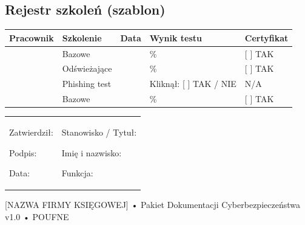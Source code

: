 \documentclass[12pt,a4paper]{article}
\begin{document}
\subsection{Rejestr szkoleń (szablon) }\label{rejestr-szkoleux144}

\begin{longtable}[]{@{}>{\raggedright\arraybackslash}p{}>{\raggedright\arraybackslash}p{}>{\raggedright\arraybackslash}p{}>{\raggedright\arraybackslash}p{}>{\raggedright\arraybackslash}p{}@{}}
\toprule\noalign{}
Pracownik & Szkolenie & Data & Wynik testu & Certyfikat \\
\midrule\noalign{}
\endhead
\bottomrule\noalign{}
\endlastfoot
\underline{\hspace{3cm}} & Bazowe & \underline{\hspace{2cm}} &
\underline{\hspace{2cm}}\% & {[} {]} TAK \\
\underline{\hspace{3cm}} & Odświeżające & \underline{\hspace{2cm}} &
\underline{\hspace{2cm}}\% & {[} {]} TAK \\
\underline{\hspace{3cm}} & Phishing test & \underline{\hspace{2cm}}
& Kliknął: {[} {]} TAK / NIE & N/A \\
\underline{\hspace{3cm}} & Bazowe & \underline{\hspace{2cm}} &
\underline{\hspace{2cm}}\% & {[} {]} TAK \\
\end{longtable}

\begin{longtable}[]{@{}
  >{\raggedright\arraybackslash}p{}
  >{\raggedright\arraybackslash}p{}@{}}
\toprule\noalign{}
\endhead
\bottomrule\noalign{}
\endlastfoot
\begin{minipage}[t]{\linewidth}\raggedright
Zatwierdził:

Podpis: \underline{\hspace{3cm}}

Data: \underline{\hspace{4cm}}
\end{minipage} & \begin{minipage}[t]{\linewidth}\raggedright
Stanowisko / Tytuł:

Imię i nazwisko: \underline{\hspace{3cm}}

Funkcja: \underline{\hspace{3cm}}
\end{minipage} \\
\end{longtable}

{[}NAZWA FIRMY KSIĘGOWEJ{]} • Pakiet Dokumentacji Cyberbezpieczeństwa
v1.0 • POUFNE
\end{document}
